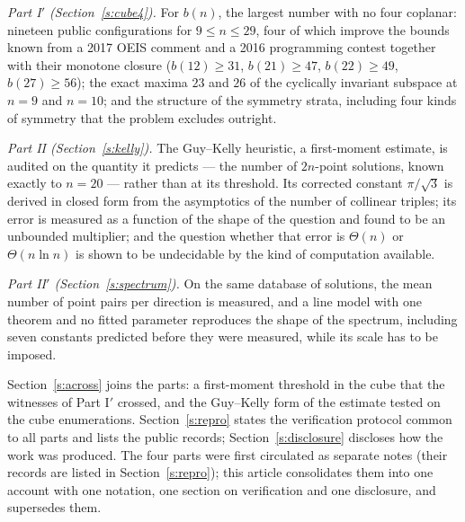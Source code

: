 \documentclass[11pt,a4paper]{article}
\begin{document}
\emph{Part I$'$ (Section~\ref{s:cube4}).}  For $b(n)$, the largest number with no four coplanar: nineteen public configurations
for $9\le n\le29$, four of which improve the bounds known from a 2017 OEIS comment and a 2016 programming contest together with
their monotone closure ($b(12)\ge31$, $b(21)\ge47$, $b(22)\ge49$, $b(27)\ge56$); the exact maxima $23$ and $26$ of the cyclically
invariant subspace at $n=9$ and $n=10$; and the structure of the symmetry strata, including four kinds of symmetry that the problem
excludes outright.

\emph{Part II (Section~\ref{s:kelly}).}  The Guy--Kelly heuristic, a first-moment estimate, is audited on the quantity it
predicts --- the number of $2n$-point solutions, known exactly to $n=20$ --- rather than at its threshold.  Its corrected constant
$\pi/\sqrt3$ is derived in closed form from the asymptotics of the number of collinear triples; its error is measured as a function
of the shape of the question and found to be an unbounded multiplier; and the question whether that error is $\Theta(n)$ or
$\Theta(n\ln n)$ is shown to be undecidable by the kind of computation available.

\emph{Part II$'$ (Section~\ref{s:spectrum}).}  On the same database of solutions, the mean number of point pairs per direction is
measured, and a line model with one theorem and no fitted parameter reproduces the shape of the spectrum, including seven constants
predicted before they were measured, while its scale has to be imposed.

Section~\ref{s:across} joins the parts: a first-moment threshold in the cube that the witnesses of Part I$'$ crossed, and the
Guy--Kelly form of the estimate tested on the cube enumerations.  Section~\ref{s:repro} states the verification protocol common to
all parts and lists the public records; Section~\ref{s:disclosure} discloses how the work was produced.  The four parts were first
circulated as separate notes (their records are listed in Section~\ref{s:repro}); this article consolidates them into one account
with one notation, one section on verification and one disclosure, and supersedes them.
\end{document}
